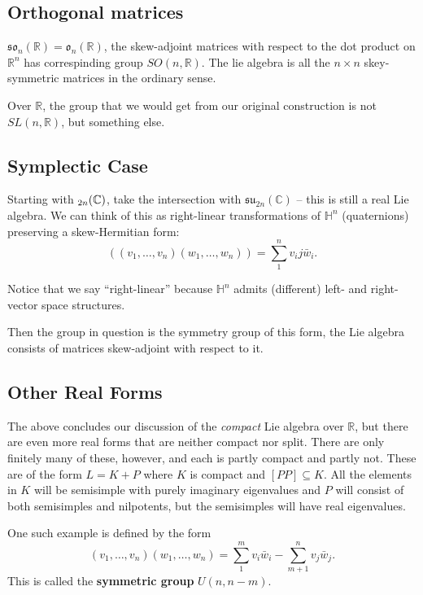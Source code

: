 \documentclass[12pt]{article}
\theoremstyle{nonumberbreak}
\theoremstyle{changebreak}
\theoremstyle{nonumberbreak}
\theoremstyle{change}
\newcommand*{\R}{
\mathbb{R}
}
\newcommand*{\C}{
\mathbb{C}
}
\let\sp\relax
\DeclareMathOperator{\sp}{\mathfrak{sp}}
\begin{document}
\subsection{Orthogonal matrices}
$\mathfrak{so}_n(\R)=\mathfrak{o}_n(\R)$, the skew-adjoint matrices with respect to the dot product on $\R^n$ has correspinding group $SO(n,\R)$.
The lie algebra is all the $n\times n$ skey-symmetric matrices in the ordinary sense.

Over $\R$, the group that we would get from our original construction is not $SL(n,\R)$, but something else.

\subsection{Symplectic Case}
Starting with $\sp_{2n}(\C)$, take the intersection with $\mathfrak{su}_{2n}(\C)$ -- this is still a real Lie algebra.
We can think of this as right-linear transformations of $\mathbb{H}^n$ (quaternions) preserving a skew-Hermitian form:
\[((v_1,\dots,v_n)(w_1,\dots,w_n))=\sum_1^nv_ij\bar w_i.\]

Notice that we say ``right-linear'' because $\mathbb{H}^n$ admits (different) left- and right-vector space structures.

Then the group in question is the symmetry group of this form, the Lie algebra consists of matrices skew-adjoint with respect to it.

\subsection{Other Real Forms}
The above concludes our discussion of the \textit{compact} Lie algebra over $\R$, but there are even 
more real forms that are neither compact nor split. There are only finitely many of these, however, and each is partly compact and partly not.
These are of the form $L=K+P$ where $K$ is compact and $[PP]\subseteq K$. All the elements in $K$ will be semisimple
with purely imaginary eigenvalues and $P$ will consist of both semisimples and nilpotents, but the semisimples will have 
real eigenvalues.

One such example is defined by the form 
\[(v_1,\dots,v_n)(w_1,\dots,w_n)=\sum_1^m v_i\bar w_i-\sum_{m+1}^n v_j\bar w_j.\]
This is called the \textbf{symmetric group} $U(n,n-m)$.

\end{document}
